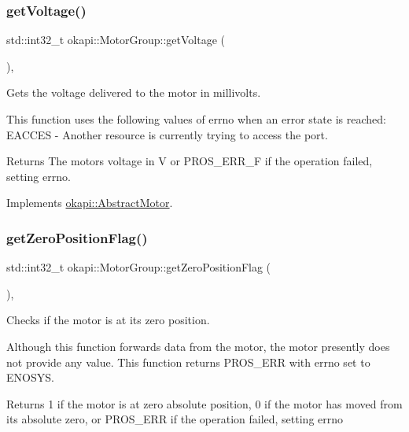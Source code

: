 \subsubsection{\texorpdfstring{getVoltage()}{getVoltage()}}
{\footnotesize\ttfamily std\+::int32\+\_\+t okapi\+::\+Motor\+Group\+::get\+Voltage (\begin{DoxyParamCaption}{ }\end{DoxyParamCaption})\hspace{0.3cm}{\ttfamily [override]}, {\ttfamily [virtual]}}

Gets the voltage delivered to the motor in millivolts.

This function uses the following values of errno when an error state is reached\+: E\+A\+C\+C\+ES -\/ Another resource is currently trying to access the port.

\begin{DoxyReturn}{Returns}
The motor\textquotesingle{}s voltage in V or P\+R\+O\+S\+\_\+\+E\+R\+R\+\_\+F if the operation failed, setting errno. 
\end{DoxyReturn}


Implements \mbox{\hyperlink{classokapi_1_1AbstractMotor_a855b35b508e90074f21662b06ad2a0c8}{okapi\+::\+Abstract\+Motor}}.

\mbox{\label{classokapi_1_1MotorGroup_a94be8c4591e65b268dd4f7357fdf4b50}} 
\subsubsection{\texorpdfstring{getZeroPositionFlag()}{getZeroPositionFlag()}}
{\footnotesize\ttfamily std\+::int32\+\_\+t okapi\+::\+Motor\+Group\+::get\+Zero\+Position\+Flag (\begin{DoxyParamCaption}{ }\end{DoxyParamCaption})\hspace{0.3cm}{\ttfamily [override]}, {\ttfamily [virtual]}}

Checks if the motor is at its zero position.

Although this function forwards data from the motor, the motor presently does not provide any value. This function returns P\+R\+O\+S\+\_\+\+E\+RR with errno set to E\+N\+O\+S\+YS.

\begin{DoxyReturn}{Returns}
1 if the motor is at zero absolute position, 0 if the motor has moved from its absolute zero, or P\+R\+O\+S\+\_\+\+E\+RR if the operation failed, setting errno 
\end{DoxyReturn}


